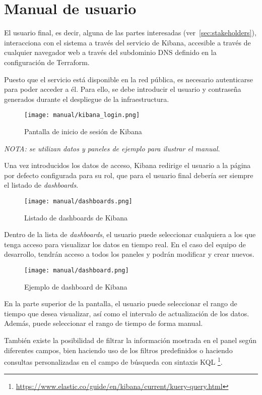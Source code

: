 \section{Manual de usuario}\label{sec:manual_usuario}
El usuario final, es decir, alguna de las partes interesadas
(ver~\ref{sec:stakeholders}), interacciona con el sistema a través del
servicio de Kibana, accesible a través de cualquier navegador web a través
del subdominio DNS definido en la configuración de Terraform.

Puesto que el servicio está disponible en la red pública, es necesario
autenticarse para poder acceder a él. Para ello, se debe introducir el
usuario y contraseña generados durante el despliegue de la infraestructura.

\begin{figure}[H]
	\centering
  	\texttt{[image: manual/kibana\_login.png]}
  	\caption{Pantalla de inicio de sesión de Kibana}
  \label{fig:login}
\end{figure}

\emph{NOTA: se utilizan datos y paneles de ejemplo para ilustrar el manual.}

Una vez introducidos los datos de acceso, Kibana redirige el usuario a la
página por defecto configurada para su rol, que para el usuario final debería
ser siempre el listado de \textit{dashboards}.

\begin{figure}[H]
	\centering
  	\texttt{[image: manual/dashboards.png]}
  	\caption{Listado de dashboards de Kibana}
  \label{fig:dashboards}
\end{figure}

Dentro de la lista de \textit{dashboards}, el usuario puede seleccionar
cualquiera a los que tenga acceso para visualizar los datos en tiempo real.
En el caso del equipo de desarrollo, tendrán acceso a todos los paneles y
podrán modificar y crear nuevos.

\begin{figure}[H]
	\centering
  	\texttt{[image: manual/dashboard.png]}
  	\caption{Ejemplo de dashboard de Kibana}
  \label{fig:dashboard}
\end{figure}

En la parte superior de la pantalla, el usuario puede seleccionar el rango de
tiempo que desea visualizar, así como el intervalo de actualización de los
datos. Además, puede seleccionar el rango de tiempo de forma manual.

\newpage{}
También existe la posibilidad de filtrar la información mostrada en el panel
según diferentes campos, bien haciendo uso de los filtros predefinidos o
haciendo consultas personalizadas en el campo de búsqueda con sintaxis KQL
\footnote{\url{https://www.elastic.co/guide/en/kibana/current/kuery-query.html}}.

